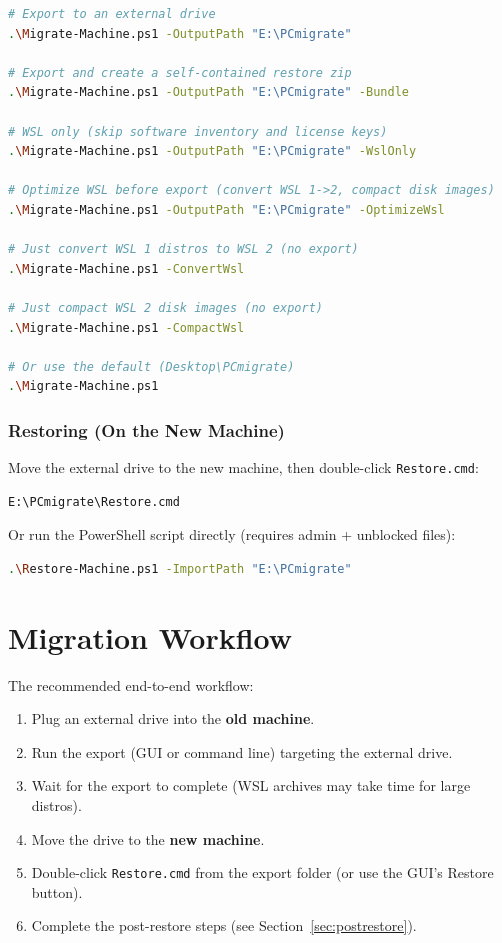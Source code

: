 \documentclass[11pt,a4paper]{article}
\begin{document}
\begin{lstlisting}[language=bash]
# Export to an external drive
.\Migrate-Machine.ps1 -OutputPath "E:\PCmigrate"

# Export and create a self-contained restore zip
.\Migrate-Machine.ps1 -OutputPath "E:\PCmigrate" -Bundle

# WSL only (skip software inventory and license keys)
.\Migrate-Machine.ps1 -OutputPath "E:\PCmigrate" -WslOnly

# Optimize WSL before export (convert WSL 1->2, compact disk images)
.\Migrate-Machine.ps1 -OutputPath "E:\PCmigrate" -OptimizeWsl

# Just convert WSL 1 distros to WSL 2 (no export)
.\Migrate-Machine.ps1 -ConvertWsl

# Just compact WSL 2 disk images (no export)
.\Migrate-Machine.ps1 -CompactWsl

# Or use the default (Desktop\PCmigrate)
.\Migrate-Machine.ps1
\end{lstlisting}

\subsubsection{Restoring (On the New Machine)}

Move the external drive to the new machine, then double-click \texttt{Restore.cmd}:

\begin{lstlisting}[language=bash]
E:\PCmigrate\Restore.cmd
\end{lstlisting}

Or run the PowerShell script directly (requires admin + unblocked files):

\begin{lstlisting}[language=bash]
.\Restore-Machine.ps1 -ImportPath "E:\PCmigrate"
\end{lstlisting}

\section{Migration Workflow}

The recommended end-to-end workflow:

\begin{enumerate}
    \item Plug an external drive into the \textbf{old machine}.
    \item Run the export (GUI or command line) targeting the external drive.
    \item Wait for the export to complete (WSL archives may take time for large distros).
    \item Move the drive to the \textbf{new machine}.
    \item Double-click \texttt{Restore.cmd} from the export folder (or use the GUI's Restore button).
    \item Complete the post-restore steps (see Section~\ref{sec:postrestore}).
\end{enumerate}
\end{document}
